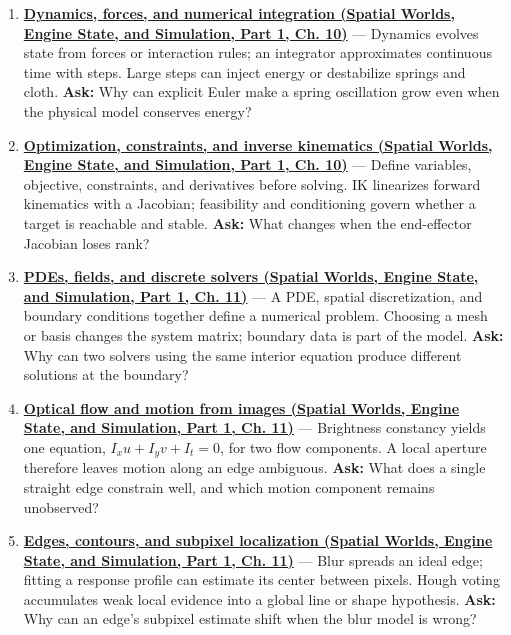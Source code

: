 \begin{enumerate}
\item
  \textbf{\href{../05-Spatial-Worlds-Engine-State-and-Simulation-P01/main.pdf\#nameddest=04-visual-computing-ii-ch029-dynamics-forces-and-numerical-integration}{Dynamics, forces, and numerical integration (Spatial Worlds, Engine State, and Simulation, Part 1, Ch. 10)}} --- Dynamics evolves state from forces or interaction rules; an integrator approximates continuous time with steps. Large steps can inject energy or destabilize springs and cloth. \textbf{Ask:} Why can explicit Euler make a spring oscillation grow even when the physical model conserves energy?
\item
  \textbf{\href{../05-Spatial-Worlds-Engine-State-and-Simulation-P01/main.pdf\#nameddest=04-visual-computing-ii-ch029-optimization-constraints-and-inverse-kinematics}{Optimization, constraints, and inverse kinematics (Spatial Worlds, Engine State, and Simulation, Part 1, Ch. 10)}} --- Define variables, objective, constraints, and derivatives before solving. IK linearizes forward kinematics with a Jacobian; feasibility and conditioning govern whether a target is reachable and stable. \textbf{Ask:} What changes when the end-effector Jacobian loses rank?
\item
  \textbf{\href{../05-Spatial-Worlds-Engine-State-and-Simulation-P01/main.pdf\#nameddest=04-visual-computing-ii-ch030-pdes-fields-and-discrete-solvers}{PDEs, fields, and discrete solvers (Spatial Worlds, Engine State, and Simulation, Part 1, Ch. 11)}} --- A PDE, spatial discretization, and boundary conditions together define a numerical problem. Choosing a mesh or basis changes the system matrix; boundary data is part of the model. \textbf{Ask:} Why can two solvers using the same interior equation produce different solutions at the boundary?
\item
  \textbf{\href{../05-Spatial-Worlds-Engine-State-and-Simulation-P01/main.pdf\#nameddest=04-visual-computing-ii-ch030-optical-flow-and-motion-from-images}{Optical flow and motion from images (Spatial Worlds, Engine State, and Simulation, Part 1, Ch. 11)}} --- Brightness constancy yields one equation, \(I_xu+I_yv+I_t=0\), for two flow components. A local aperture therefore leaves motion along an edge ambiguous. \textbf{Ask:} What does a single straight edge constrain well, and which motion component remains unobserved?
\item
  \textbf{\href{../05-Spatial-Worlds-Engine-State-and-Simulation-P01/main.pdf\#nameddest=04-visual-computing-ii-ch030-edges-contours-and-subpixel-localization}{Edges, contours, and subpixel localization (Spatial Worlds, Engine State, and Simulation, Part 1, Ch. 11)}} --- Blur spreads an ideal edge; fitting a response profile can estimate its center between pixels. Hough voting accumulates weak local evidence into a global line or shape hypothesis. \textbf{Ask:} Why can an edge's subpixel estimate shift when the blur model is wrong?

\end{enumerate}

